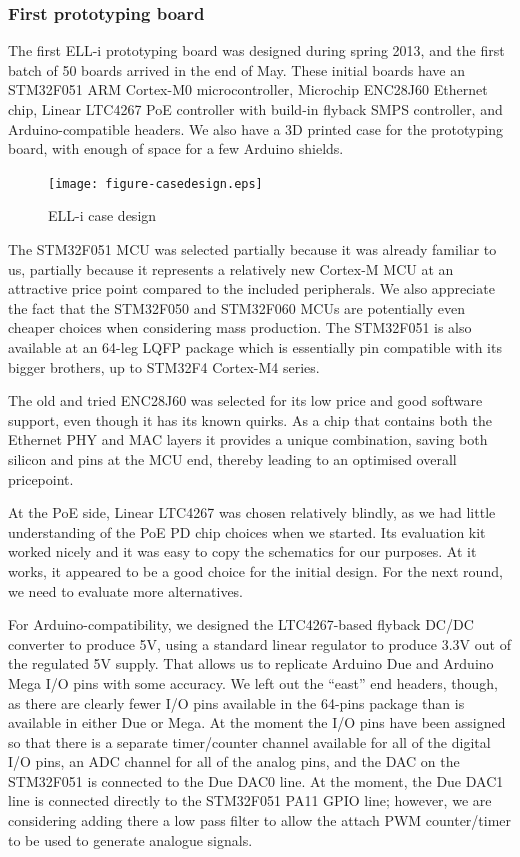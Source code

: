 \documentclass[final]{siamltex}
\begin{document}
\subsubsection{First prototyping board}

The first ELL-i prototyping board was designed during spring 2013, and
the first batch of 50 boards arrived in the end of May.  These initial
boards have an STM32F051\cite{STM32F051} ARM Cortex-M0
microcontroller, Microchip ENC28J60\cite{ENC28J60} Ethernet chip,
Linear LTC4267 PoE controller with build-in flyback SMPS controller,
and Arduino-compatible headers.  We also have a 3D printed case for
the prototyping board, with enough of space for a few Arduino shields.

\begin{figure}
\centering
\texttt{[image: figure-casedesign.eps]}
\caption{ELL-i case design}
\label{fig:casedesign}
\end{figure}

The STM32F051 MCU was selected partially because it was already
familiar to us, partially because it represents a relatively new
Cortex-M MCU at an attractive price point compared to the included
peripherals.  We also appreciate the fact that the STM32F050 and
STM32F060 MCUs are potentially even cheaper choices when considering
mass production.  The STM32F051 is also available at an 64-leg LQFP
package which is essentially pin compatible with its bigger brothers,
up to STM32F4 Cortex-M4 series.

The old and tried ENC28J60 was selected for its low price and good
software support, even though it has its known quirks.  As a chip that
contains both the Ethernet PHY and MAC layers it provides a unique
combination, saving both silicon and pins at the MCU end, thereby
leading to an optimised overall pricepoint.

At the PoE side, Linear LTC4267 was chosen relatively blindly, as we
had little understanding of the PoE PD chip choices when we started.
Its evaluation kit worked nicely and it was easy to copy the
schematics for our purposes.  At it works, it appeared to be a good
choice for the initial design.  For the next round, we need to
evaluate more alternatives.

For Arduino-compatibility, we designed the LTC4267-based flyback DC/DC
converter to produce 5V, using a standard linear regulator to produce
3.3V out of the regulated 5V supply.  That allows us to replicate
Arduino Due and Arduino Mega I/O pins with some accuracy.  We left out
the ``east'' end headers, though, as there are clearly fewer I/O pins
available in the 64-pins package than is available in either Due or
Mega.  At the moment the I/O pins have been assigned so that there is
a separate timer/counter channel available for all of the digital I/O
pins, an ADC channel for all of the analog pins, and the DAC on the
STM32F051 is connected to the Due DAC0 line.  At the moment, the Due
DAC1 line is connected directly to the STM32F051 PA11 GPIO line;
however, we are considering adding there a low pass filter to allow
the attach PWM counter/timer to be used to generate analogue signals.
\end{document}
